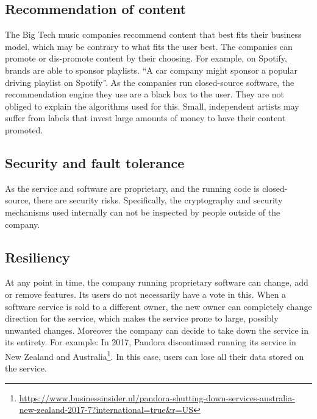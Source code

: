 \subsection{Recommendation of content}
The Big Tech music companies recommend content that best fits their business model, which may be contrary to what fits the user best. The companies can promote or dis-promote content by their choosing. For example, on Spotify, brands are able to sponsor playlists. ``A car company might sponsor a popular driving playlist on Spotify''\cite{prey2018nothing}. As the companies run closed-source software, the recommendation engine they use are a black box to the user. They are not obliged to explain the algorithms used for this. Small, independent artists may suffer from labels that invest large amounts of money to have their content promoted.
\subsection{Security and fault tolerance}
As the service and software are proprietary, and the running code is closed-source, there are security risks. Specifically, the cryptography and security mechanisms used internally can not be inspected by people outside of the company. 
\subsection{Resiliency}
At any point in time, the company running proprietary software can change, add or remove features. Its users do not necessarily have a vote in this. When a software service is sold to a different owner, the new owner can completely change direction for the service, which makes the service prone to large, possibly unwanted changes. Moreover the company can decide to take down the service in its entirety. For example: In 2017, Pandora discontinued running its service in New Zealand and Australia\footnote{\url{https://www.businessinsider.nl/pandora-shutting-down-services-australia-new-zealand-2017-7?international=true&r=US}}. In this case, users can lose all their data stored on the service.
